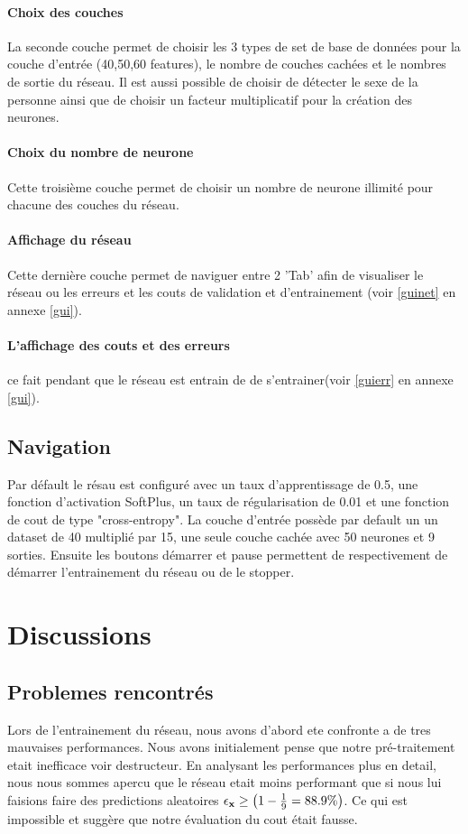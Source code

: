 \documentclass[11pt]{article}
\begin{document}
\paragraph{Choix des couches} La seconde couche permet de choisir les 3 types
de set de base de donn\'ees pour la couche d'entr\'ee (40,50,60 features), le
nombre de couches cach\'ees et le nombres de sortie du r\'eseau. Il est aussi
possible de choisir de d\'etecter le sexe de la personne ainsi que de choisir
un facteur multiplicatif pour la cr\'eation des neurones.

\paragraph{Choix du nombre de neurone} Cette troisi\`eme couche permet de
choisir un nombre de neurone illimit\'e pour chacune des couches du r\'eseau.

\paragraph{Affichage du r\'eseau} Cette derni\`ere couche permet de naviguer
entre 2 'Tab' afin de visualiser le r\'eseau ou les erreurs et les couts de
validation et d'entrainement (voir \ref{guinet} en annexe \ref{gui}).
\paragraph{L'affichage des couts et des erreurs} ce fait pendant que le
r\'eseau est entrain de de s'entrainer(voir \ref{guierr} en annexe \ref{gui}).

\subsection{Navigation}
Par d\'efault le r\'esau est configur\'e avec un taux d'apprentissage de 0.5,
une fonction d'activation SoftPlus, un taux de r\'egularisation de 0.01 et une
fonction de cout de type "cross-entropy". La couche d'entr\'ee poss\`ede par
default un un dataset de 40 multipli\'e par 15, une seule couche cach\'ee avec
50 neurones et 9 sorties. Ensuite les boutons d\'emarrer et pause permettent
de respectivement de d\'emarrer l'entrainement du r\'eseau ou de le stopper.



\section{Discussions}
\subsection{Problemes rencontr\'es}
Lors de l'entrainement du r\'eseau, nous avons d'abord ete confronte a de tres
mauvaises performances. Nous avons initialement pense que notre pr\'e-traitement
etait inefficace voir destructeur. En analysant les performances plus en detail,
nous nous sommes apercu que le r\'eseau etait moins performant que si nous lui
faisions faire des predictions aleatoires
$\epsilon_{\bf x} \ge \left (1 - \frac{1}{9} = 88.9\% \right)$.
Ce qui est impossible et sugg\`ere que notre \'evaluation du cout \'etait fausse.
\end{document}

